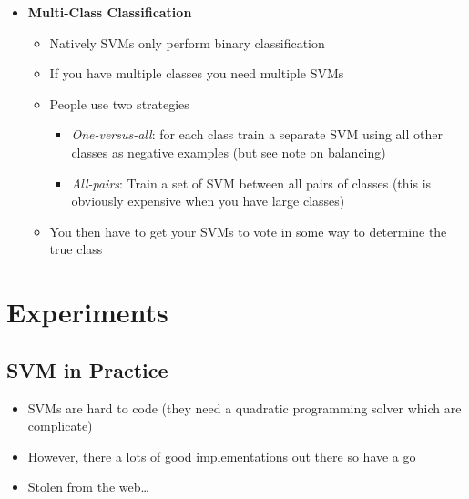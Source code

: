 \documentclass[11pt]{article}
\begin{document}
\begin{itemize}
\item \textbf{Multi-Class Classification}
\begin{itemize}
\item Natively SVMs only perform binary classification
\item If you have multiple classes you need multiple SVMs
\item People use two strategies
\begin{itemize}
\item \emph{One-versus-all}: for each class train a separate SVM
using all other classes as negative examples (but see note on
balancing)
\item \emph{All-pairs}:  Train a set of SVM between all pairs of classes
(this is obviously expensive when you have large classes)
\end{itemize}
\item You then have to get your SVMs to vote in some way to determine
the true class
\end{itemize}
\end{itemize}



\section{Experiments}
\label{sec:org759da99}

\subsection{SVM in Practice}
\label{sec:orge676d83}
\begin{itemize}
\item SVMs are hard to code (they need a quadratic programming solver
which are complicate)
\item However, there a lots of good implementations out there so have a go
\item Stolen from the web\ldots
\end{itemize}
\end{document}
